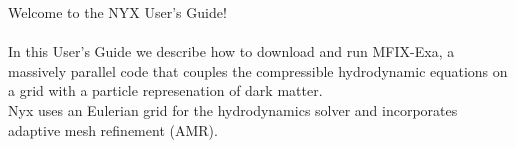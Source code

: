 \noindent Welcome to the NYX User's Guide!\\ \\

In this User's Guide we describe how to download and run MFIX-Exa, a massively parallel code
that couples the compressible hydrodynamic equations on a grid with a particle represenation
of dark matter. \\

Nyx uses an Eulerian grid for the hydrodynamics solver and incorporates adaptive mesh refinement (AMR).

